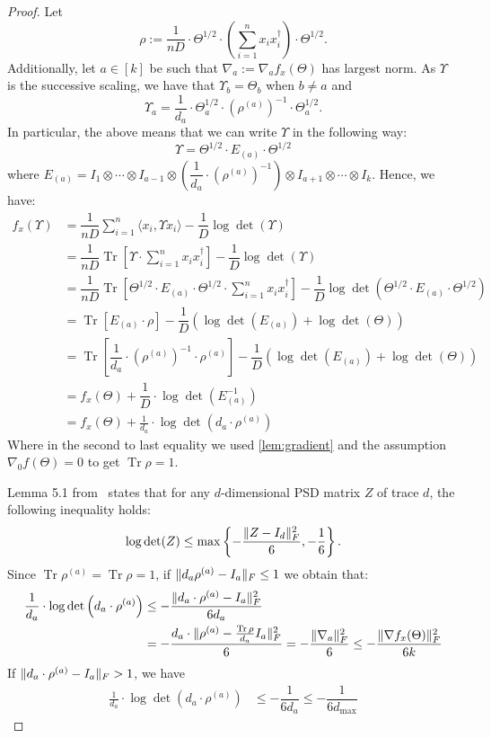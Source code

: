\documentclass[aos]{imsart}
\theoremstyle{definition}
\numberwithin{equation}{section}
\DeclareMathOperator{\tr}{Tr}
\DeclarePairedDelimiter{\norm}{\lVert}{\rVert}
\def\dmax{d_{\max}}
\begin{document}
\begin{proof}
	Let
	$$\rho := \dfrac{1}{nD} \cdot  \Theta^{1/2} \cdot \left( \sum_{i=1}^n x_i x_i^\dagger \right) \cdot \Theta^{1/2}.$$
	Additionally, let $a \in [k]$ be such that $\nabla_a := \nabla_a f_x(\Theta)$ has largest norm.
	As $\Upsilon$ is the successive scaling, we have that $\Upsilon_b = \Theta_b$ when $b \neq a$ and
	$$ \Upsilon_a = \dfrac{1}{d_a} \cdot \Theta_a^{1/2} \cdot (\rho^{(a)})^{-1} \cdot \Theta_a^{1/2}. $$
	In particular, the above means that we can write $\Upsilon$ in the following way:
	$$ \Upsilon = \Theta^{1/2} \cdot  E_{(a)} \cdot \Theta^{1/2} $$
	where $E_{(a)} = I_1 \otimes \cdots \otimes I_{a-1} \otimes \left( \dfrac{1}{d_a} \cdot (\rho^{(a)})^{-1} \right) \otimes I_{a+1} \otimes \cdots \otimes I_k$.
	Hence, we have:
	\begin{align*}
		f_x(\Upsilon) &= \dfrac{1}{nD} \sum_{i=1}^n \langle x_i , \Upsilon x_i \rangle - \dfrac{1}{D} \log \det(\Upsilon) \\
		&= \dfrac{1}{nD} \tr\left[ \Upsilon \cdot  \sum_{i=1}^n x_i x_i^\dagger  \right] - \dfrac{1}{D} \log \det(\Upsilon) \\
		&= \dfrac{1}{nD} \tr\left[ \Theta^{1/2} \cdot  E_{(a)} \cdot \Theta^{1/2}  \cdot  \sum_{i=1}^n x_i x_i^\dagger  \right] - \dfrac{1}{D} \log \det(\Theta^{1/2} \cdot  E_{(a)} \cdot \Theta^{1/2}) \\
		&= \tr\left[  E_{(a)} \cdot \rho  \right] - \dfrac{1}{D} \left( \log \det(E_{(a)}) + \log\det(\Theta) \right) \\
		&= \tr\left[ \dfrac{1}{d_a} \cdot (\rho^{(a)})^{-1} \cdot \rho^{(a)}  \right] - \dfrac{1}{D} \left( \log \det(E_{(a)}) + \log\det(\Theta) \right) \\
		&= f_x(\Theta) + \dfrac{1}{D} \cdot \log \det\left( E_{(a)}^{-1} \right) \\
		&= f_x(\Theta) + \frac{1}{d_a} \cdot  \log\det\left( d_a \cdot \rho^{(a)} \right)
	\end{align*}
	Where in the second to last equality we used \cref{lem:gradient} and the assumption $\nabla_0 f(\Theta) = 0$ to get $\tr \rho = 1$. 
	
	Lemma 5.1 from~\cite{GGOW19} states that for any $d$-dimensional PSD matrix $Z$ of trace $d$, the following inequality holds:
	$$ \log\det(Z) \leq \max\left\{- \dfrac{\norm{Z - I_d}_F^2}{6}, - \dfrac{1}{6} \right\}. $$
	Since $\tr \rho^{(a)} = \tr \rho = 1$, if $\norm{d_a \rho^{(a)} - I_a}_F \leq 1$ we obtain that:
	\begin{align*}
		\frac{1}{d_a} \cdot  \log\det\left(d_a \cdot \rho^{(a)} \right) &\leq - \dfrac{\norm{d_a \cdot \rho^{(a)} - I_a}_F^2}{6 d_a} \\
		&= - \dfrac{d_a \cdot \norm{ \rho^{(a)} - \frac{\tr \rho}{d_a} I_a}_F^2}{6} = - \dfrac{\norm{\nabla_a}_F^2}{6} \leq - \dfrac{\norm{\nabla f_x(\Theta)}_F^2}{6k}
	\end{align*}
	If $\norm{d_a \cdot \rho^{(a)} - I_a}_F > 1$, we have
	\begin{align*}
		\frac{1}{d_a} \cdot  \log\det(d_a \cdot \rho^{(a)}) &\leq - \dfrac{1}{6 d_a} \leq - \dfrac{1}{6 \dmax}
	\end{align*}
\end{proof}
\end{document}
